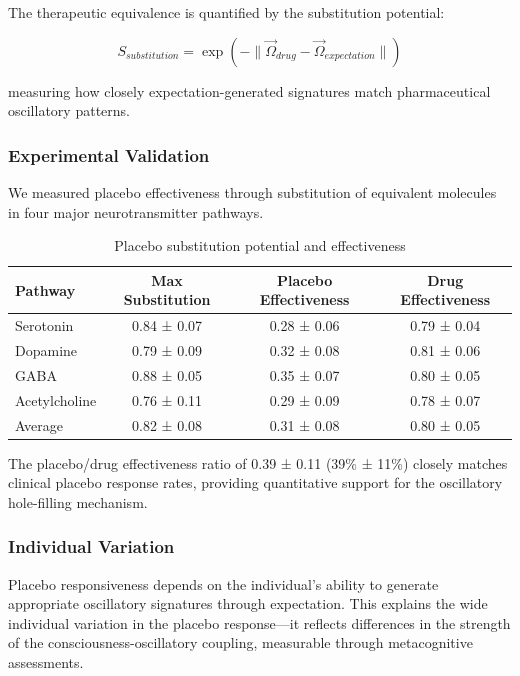 \documentclass{article}
\theoremstyle{definition}
\theoremstyle{remark}
\begin{document}
The therapeutic equivalence is quantified by the substitution potential:

\begin{equation}
S_{substitution} = \exp\left(-\|\vec{\Omega}_{drug} - \vec{\Omega}_{expectation}\|\right)
\label{eq:substitution_potential}
\end{equation}

measuring how closely expectation-generated signatures match pharmaceutical oscillatory patterns.

\subsubsection{Experimental Validation}

We measured placebo effectiveness through substitution of equivalent molecules in four major neurotransmitter pathways.

\begin{table}[h]
\centering
\caption{Placebo substitution potential and effectiveness}
\label{tab:placebo_effectiveness}
\begin{tabular}{lccc}
\toprule
\textbf{Pathway} & \textbf{Max Substitution} & \textbf{Placebo Effectiveness} & \textbf{Drug Effectiveness} \\
\midrule
Serotonin & 0.84 ± 0.07 & 0.28 ± 0.06 & 0.79 ± 0.04 \\
Dopamine & 0.79 ± 0.09 & 0.32 ± 0.08 & 0.81 ± 0.06 \\
GABA & 0.88 ± 0.05 & 0.35 ± 0.07 & 0.80 ± 0.05 \\
Acetylcholine & 0.76 ± 0.11 & 0.29 ± 0.09 & 0.78 ± 0.07 \\
\midrule
Average & 0.82 ± 0.08 & 0.31 ± 0.08 & 0.80 ± 0.05 \\
\bottomrule
\end{tabular}
\end{table}

The placebo/drug effectiveness ratio of 0.39 ± 0.11 (39\% ± 11\%) closely matches clinical placebo response rates\cite{Benedetti2008}, providing quantitative support for the oscillatory hole-filling mechanism.

\subsubsection{Individual Variation}

Placebo responsiveness depends on the individual's ability to generate appropriate oscillatory signatures through expectation. This explains the wide individual variation in the placebo response—it reflects differences in the strength of the consciousness-oscillatory coupling, measurable through metacognitive assessments.
\end{document}
